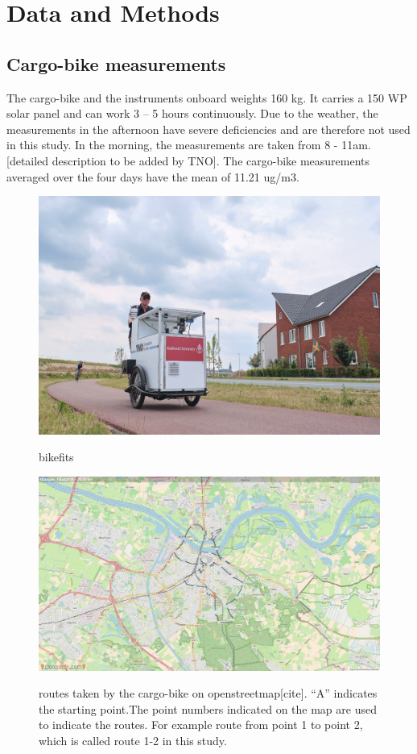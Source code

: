 \documentclass{article}
\begin{document}
\section{Data and Methods}
\subsection{Cargo-bike measurements}
The cargo-bike and the instruments onboard weights 160 kg. It carries a 150 WP solar panel and can work 3 – 5 hours continuously.  Due to the weather, the measurements in the afternoon have severe deficiencies and are therefore not used in this study. In the morning, the measurements are taken from 8 - 11am. 
[detailed description to be added by TNO].
The cargo-bike measurements averaged over the four days have the mean of 11.21 ug/m3. 
\begin{figure}
    \includegraphics[width=\linewidth]{f1a.jpg}
    \label{bike}
    \caption {bikefits}
\end{figure}
\begin{figure}
    \includegraphics[width=\linewidth]{f1b.jpg}
    \label{route}
    \caption {routes taken by the cargo-bike on openstreetmap[cite]. “A” indicates the starting point.The point numbers indicated on the map are used to indicate the routes. For example route from point 1 to point 2, which is called route 1-2 in this study.}
\end{figure}
\end{document}
